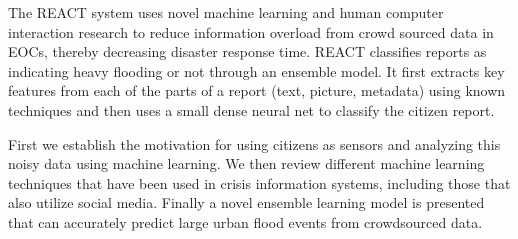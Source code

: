 The REACT system uses novel machine learning and human computer interaction
research to reduce information overload from crowd sourced data in EOCs, thereby
decreasing disaster response time. REACT classifies reports as indicating heavy
flooding or not through an ensemble model. It first extracts key features from
each of the parts of a report (text, picture, metadata) using known techniques
and then uses a small dense neural net to classify the citizen report.

First we establish the motivation for using citizens as sensors and
analyzing this noisy data using machine learning. We then review different
machine learning techniques that have been used in crisis information
systems, including those that also utilize social media.  Finally a novel
ensemble learning model is presented that can accurately predict large urban
flood events from crowdsourced data.
